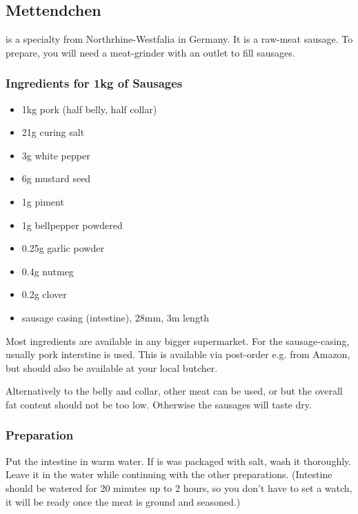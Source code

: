 \subsection{Mettendchen}
 is a specialty from Northrhine-Westfalia in Germany. It is a raw-meat sausage.
To prepare, you will need a meat-grinder with an outlet to fill sausages.

\subsubsection{Ingredients for 1kg of Sausages}
  \begin{itemize}
    \item{1kg pork (half belly, half collar)}
    \item{21g curing salt}
    \item{3g white pepper}
    \item{6g mustard seed}
    \item{1g piment}
    \item{1g bellpepper powdered}
    \item{0.25g garlic powder}
    \item{0.4g nutmeg}
    \item{0.2g clover}
    \item{sausage casing (intestine), 28mm, 3m length}
  \end{itemize}

Most ingredients are available in any bigger supermarket. For the sausage-casing,
 usually pork interstine is used. This is available via post-order 
e.g. from Amazon, but should also be available at your local butcher.

Alternatively to the belly and collar, other meat can be used, or but 
the overall fat content should not be too low. Otherwise the sausages 
will taste dry. 

\subsubsection{Preparation}

Put the intestine in warm water. If is was packaged with salt, wash it thoroughly. 
Leave it in the water while continuing with the other preparations. (Intestine 
should be watered for 20 minutes up to 2 hours, so you don't have to set a watch,
it will be ready once the meat is ground and seasoned.)

